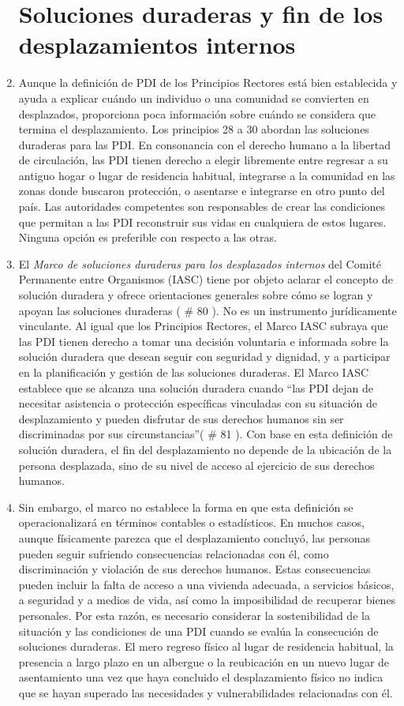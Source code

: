 \documentclass[
]{book}
\begin{document}
\begin{enumerate}
{  \section{Soluciones duraderas y fin de los desplazamientos internos}\label{soluciones-duraderas-y-fin-de-los-desplazamientos-internos}}
\item
  Aunque la definición de PDI de los Principios Rectores está bien establecida y ayuda a explicar cuándo un individuo o una comunidad se convierten en desplazados, proporciona poca información sobre cuándo se considera que termina el desplazamiento. Los principios 28 a 30 abordan las soluciones duraderas para las PDI. En consonancia con el derecho humano a la libertad de circulación, las PDI tienen derecho a elegir libremente entre regresar a su antiguo hogar o lugar de residencia habitual, integrarse a la comunidad en las zonas donde buscaron protección, o asentarse e integrarse en otro punto del país. Las autoridades competentes son responsables de crear las condiciones que permitan a las PDI reconstruir sus vidas en cualquiera de estos lugares. Ninguna opción es preferible con respecto a las otras.
\item
  El \emph{Marco de soluciones duraderas para los desplazados internos} del Comité Permanente entre Organismos (IASC) tiene por objeto aclarar el concepto de solución duradera y ofrece orientaciones generales sobre cómo se logran y apoyan las soluciones duraderas (
  \# 80
  ). No es un instrumento jurídicamente vinculante. Al igual que los Principios Rectores, el Marco IASC subraya que las PDI tienen derecho a tomar una decisión voluntaria e informada sobre la solución duradera que desean seguir con seguridad y dignidad, y a participar en la planificación y gestión de las soluciones duraderas. El Marco IASC establece que se alcanza una solución duradera cuando ``las PDI dejan de necesitar asistencia o protección específicas vinculadas con su situación de desplazamiento y pueden disfrutar de sus derechos humanos sin ser discriminadas por sus circunstancias''(
  \# 81
  ). Con base en esta definición de solución duradera, el fin del desplazamiento no depende de la ubicación de la persona desplazada, sino de su nivel de acceso al ejercicio de sus derechos humanos.
\item
  Sin embargo, el marco no establece la forma en que esta definición se operacionalizará en términos contables o estadísticos. En muchos casos, aunque físicamente parezca que el desplazamiento concluyó, las personas pueden seguir sufriendo consecuencias relacionadas con él, como discriminación y violación de sus derechos humanos. Estas consecuencias pueden incluir la falta de acceso a una vivienda adecuada, a servicios básicos, a seguridad y a medios de vida, así como la imposibilidad de recuperar bienes personales. Por esta razón, es necesario considerar la sostenibilidad de la situación y las condiciones de una PDI cuando se evalúa la consecución de soluciones duraderas. El mero regreso físico al lugar de residencia habitual, la presencia a largo plazo en un albergue o la reubicación en un nuevo lugar de asentamiento una vez que haya concluido el desplazamiento físico no indica que se hayan superado las necesidades y vulnerabilidades relacionadas con él.

\end{enumerate}
\end{document}
